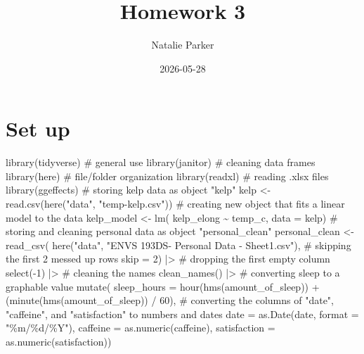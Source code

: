 \documentclass[
  letterpaper,
  DIV=11,
  numbers=noendperiod]{scrartcl}
\title{Homework 3}
\author{Natalie Parker}
\date{2026-05-28}
\newenvironment{Shaded}{\begin{snugshade}}{\end{snugshade}}
\newcommand{\AttributeTok}[1]{\textcolor[rgb]{0.40,0.45,0.13}{#1}}
\newcommand{\CommentTok}[1]{\textcolor[rgb]{0.37,0.37,0.37}{#1}}
\newcommand{\DecValTok}[1]{\textcolor[rgb]{0.68,0.00,0.00}{#1}}
\newcommand{\FunctionTok}[1]{\textcolor[rgb]{0.28,0.35,0.67}{#1}}
\newcommand{\NormalTok}[1]{\textcolor[rgb]{0.00,0.23,0.31}{#1}}
\newcommand{\OtherTok}[1]{\textcolor[rgb]{0.00,0.23,0.31}{#1}}
\newcommand{\SpecialCharTok}[1]{\textcolor[rgb]{0.37,0.37,0.37}{#1}}
\newcommand{\StringTok}[1]{\textcolor[rgb]{0.13,0.47,0.30}{#1}}
\renewcommand*\contentsname{Table of contents}
\newcommand\contentsname{Table of contents}
\begin{document}
\maketitle

\renewcommand*\contentsname{Table of contents}
{
\hypersetup{linkcolor=}
\setcounter{tocdepth}{3}
\tableofcontents
}

\section{Set up}\label{set-up}

\begin{Shaded}
\begin{Highlighting}[]
\FunctionTok{library}\NormalTok{(tidyverse) }\CommentTok{\# general use}
\FunctionTok{library}\NormalTok{(janitor) }\CommentTok{\# cleaning data frames}
\FunctionTok{library}\NormalTok{(here) }\CommentTok{\# file/folder organization}
\FunctionTok{library}\NormalTok{(readxl) }\CommentTok{\# reading .xlsx files}
\FunctionTok{library}\NormalTok{(ggeffects)}
\CommentTok{\# storing kelp data as object "kelp"}
\NormalTok{kelp }\OtherTok{\textless{}{-}} \FunctionTok{read.csv}\NormalTok{(}\FunctionTok{here}\NormalTok{(}\StringTok{"data"}\NormalTok{, }\StringTok{"temp{-}kelp.csv"}\NormalTok{))}
\CommentTok{\# creating new object that fits a linear model to the data}
\NormalTok{kelp\_model }\OtherTok{\textless{}{-}} \FunctionTok{lm}\NormalTok{(}
\NormalTok{  kelp\_elong }\SpecialCharTok{\textasciitilde{}}\NormalTok{ temp\_c, }
  \AttributeTok{data =}\NormalTok{ kelp)}
\CommentTok{\# storing and cleaning personal data as object "personal\_clean"}
\NormalTok{personal\_clean }\OtherTok{\textless{}{-}} \FunctionTok{read\_csv}\NormalTok{(}
  \FunctionTok{here}\NormalTok{(}\StringTok{"data"}\NormalTok{, }\StringTok{"ENVS 193DS{-} Personal Data {-} Sheet1.csv"}\NormalTok{), }
  \CommentTok{\# skipping the first 2 messed up rows}
  \AttributeTok{skip =} \DecValTok{2}\NormalTok{) }\SpecialCharTok{|\textgreater{}} 
  \CommentTok{\# dropping the first empty column}
  \FunctionTok{select}\NormalTok{(}\SpecialCharTok{{-}}\DecValTok{1}\NormalTok{) }\SpecialCharTok{|\textgreater{}} 
  \CommentTok{\# cleaning the names}
  \FunctionTok{clean\_names}\NormalTok{() }\SpecialCharTok{|\textgreater{}} 
 \CommentTok{\# converting sleep to a graphable value}
  \FunctionTok{mutate}\NormalTok{(}
    \AttributeTok{sleep\_hours =} 
      \FunctionTok{hour}\NormalTok{(}\FunctionTok{hms}\NormalTok{(amount\_of\_sleep)) }\SpecialCharTok{+}\NormalTok{ (}\FunctionTok{minute}\NormalTok{(}\FunctionTok{hms}\NormalTok{(amount\_of\_sleep)) }\SpecialCharTok{/} \DecValTok{60}\NormalTok{),}
    \CommentTok{\# converting the columns of "date", "caffeine", and "satisfaction" to numbers and dates}
    \AttributeTok{date =} \FunctionTok{as.Date}\NormalTok{(date, }\AttributeTok{format =} \StringTok{"\%m/\%d/\%Y"}\NormalTok{),}
    \AttributeTok{caffeine =} \FunctionTok{as.numeric}\NormalTok{(caffeine),}
    \AttributeTok{satisfaction =} \FunctionTok{as.numeric}\NormalTok{(satisfaction))}
\end{Highlighting}
\end{Shaded}
\end{document}
